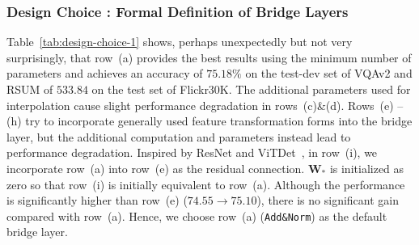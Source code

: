 \documentclass[letterpaper]{article} %
\begin{document}
\subsubsection{Design Choice \uppercase\expandafter{}: Formal Definition of Bridge Layers}

Table~\ref{tab:design-choice-1} shows, perhaps unexpectedly but not very surprisingly, 
that row~(a) provides the best results using the minimum number of parameters and achieves an accuracy of $75.18\%$ on the test-dev set of VQAv2 and RSUM of $533.84$ on the test set of Flickr30K. 
The additional parameters used for interpolation cause slight performance degradation in rows~(c)\&(d).
Rows~(e) -- (h) try to incorporate generally used feature transformation forms into the bridge layer, but the additional computation and parameters instead lead to performance degradation.
Inspired by ResNet and ViTDet~\citep{li2022exploring}, in row~(i), we incorporate row~(a) into row~(e) as the residual connection. $\mathbf{W}_*$ is initialized as zero so that row~(i) is initially equivalent to row~(a). 
Although the performance is significantly higher than row~(e) ($74.55 \rightarrow 75.10$), there is no significant gain compared with row~(a). 
Hence, we choose row~(a) (\texttt{Add\&Norm}) as the default bridge layer.
\end{document}
